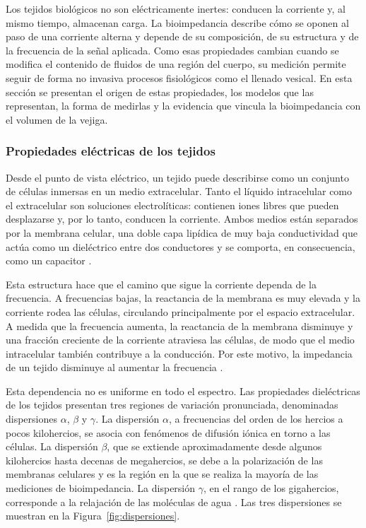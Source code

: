 \documentclass[12pt,a4paper]{article}
\begin{document}
Los tejidos biológicos no son eléctricamente inertes: conducen la corriente y, al mismo tiempo,
almacenan carga. La bioimpedancia describe cómo se oponen al paso de una corriente alterna y depende
de su composición, de su estructura y de la frecuencia de la señal aplicada. Como esas propiedades
cambian cuando se modifica el contenido de fluidos de una región del cuerpo, su medición permite
seguir de forma no invasiva procesos fisiológicos como el llenado vesical. En esta sección se
presentan el origen de estas propiedades, los modelos que las representan, la forma de medirlas y
la evidencia que vincula la bioimpedancia con el volumen de la vejiga.

\subsubsection{Propiedades eléctricas de los tejidos}

Desde el punto de vista eléctrico, un tejido puede describirse como un conjunto de células inmersas
en un medio extracelular. Tanto el líquido intracelular como el extracelular son soluciones
electrolíticas: contienen iones libres que pueden desplazarse y, por lo tanto, conducen la corriente.
Ambos medios están separados por la membrana celular, una doble capa lipídica de muy baja
conductividad que actúa como un dieléctrico entre dos conductores y se comporta, en consecuencia,
como un capacitor \cite{grimnes2015bioimpedance}.

Esta estructura hace que el camino que sigue la corriente dependa de la frecuencia. A frecuencias
bajas, la reactancia de la membrana es muy elevada y la corriente rodea las células, circulando
principalmente por el espacio extracelular. A medida que la frecuencia aumenta, la reactancia de la
membrana disminuye y una fracción creciente de la corriente atraviesa las células, de modo que el
medio intracelular también contribuye a la conducción. Por este motivo, la impedancia de un tejido
disminuye al aumentar la frecuencia \cite{grimnes2015bioimpedance}.


Esta dependencia no es uniforme en todo el espectro. Las propiedades dieléctricas de los tejidos
presentan tres regiones de variación pronunciada, denominadas dispersiones $\alpha$, $\beta$ y
$\gamma$. La dispersión $\alpha$, a frecuencias del orden de los hercios a pocos kilohercios, se
asocia con fenómenos de difusión iónica en torno a las células. La dispersión $\beta$, que se
extiende aproximadamente desde algunos kilohercios hasta decenas de megahercios, se debe a la
polarización de las membranas celulares y es la región en la que se realiza la mayoría de las
mediciones de bioimpedancia. La dispersión $\gamma$, en el rango de los gigahercios, corresponde a
la relajación de las moléculas de agua \cite{grimnes2015bioimpedance}. Las tres dispersiones se
muestran en la Figura~\ref{fig:dispersiones}.
\end{document}

